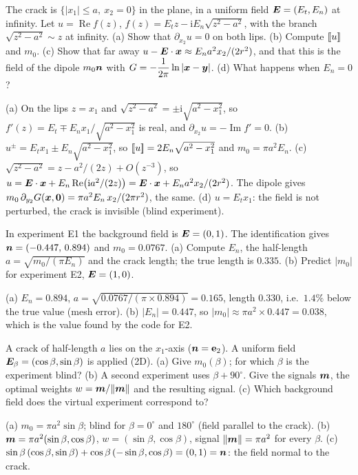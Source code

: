 The crack is $\{|x_1|\le a,\ x_2=0\}$ in the plane, in a uniform field $\bm{E}=(E_t,E_n)$ at infinity. Let $u=\operatorname{Re}f(z)$, $f(z)=E_tz-\mathrm iE_n\sqrt{z^2-a^2}$, with the branch $\sqrt{z^2-a^2}\sim z$ at infinity.
(a) Show that $\partial_{x_2}u=0$ on both lips. (b) Compute $[\![u]\!]$ and $m_0$. (c) Show that far away $u-\bm{E}\cdot\bm{x}\approx E_na^2x_2/(2r^2)$, and that this is the field of the dipole $m_0\bm{n}$ with $\displaystyle G=-\frac1{2\pi}\ln|\bm{x}-\bm{y}|$. (d) What happens when $E_n=0$?
\begin{solution}
(a) On the lips $z=x_1$ and $\sqrt{z^2-a^2}=\pm\mathrm i\sqrt{a^2-x_1^2}$, so $f'(z)=E_t\mp E_nx_1/\sqrt{a^2-x_1^2}$ is real, and $\partial_{x_2}u=-\operatorname{Im}f'=0$.
(b) $u^\pm=E_tx_1\pm E_n\sqrt{a^2-x_1^2}$, so $[\![u]\!]=2E_n\sqrt{a^2-x_1^2}$ and $m_0=\pi a^2E_n$.
(c) $\sqrt{z^2-a^2}=z-a^2/(2z)+O(z^{-3})$, so $u=\bm{E}\cdot\bm{x}+E_n\operatorname{Re}\bigl(\mathrm ia^2/(2z)\bigr)=\bm{E}\cdot\bm{x}+E_na^2x_2/(2r^2)$. The dipole gives $m_0\,\partial_{y_2}G(\bm{x},\mathbf0)=\pi a^2E_n\,x_2/(2\pi r^2)$, the same.
(d) $u=E_tx_1$: the field is not perturbed, the crack is invisible (blind experiment).
\end{solution}

In experiment E1 the background field is $\bm{E}=(0,1)$. The identification gives $\bm{n}=(-0.447,\,0.894)$ and $m_0=0.0767$. (a) Compute $E_n$, the half-length $a=\sqrt{m_0/(\pi E_n)}$ and the crack length; the true length is $0.335$. (b) Predict $|m_0|$ for experiment E2, $\bm{E}=(1,0)$.
\begin{solution}
(a) $E_n=0.894$, $a=\sqrt{0.0767/(\pi\times0.894)}=0.165$, length $0.330$, i.e.\ $1.4\%$ below the true value (mesh error). (b) $|E_n|=0.447$, so $|m_0|\approx\pi a^2\times0.447=0.038$, which is the value found by the code for E2.
\end{solution}

A crack of half-length $a$ lies on the $x_1$-axis ($\bm{n}=\mathbf e_2$). A uniform field $\bm{E}_\beta=(\cos\beta,\sin\beta)$ is applied (2D).
(a) Give $m_0(\beta)$; for which $\beta$ is the experiment blind?
(b) A second experiment uses $\beta+90^\circ$. Give the signals $\bm{m}$, the optimal weights $w=\bm{m}/\|\bm{m}\|$ and the resulting signal.
(c) Which background field does the virtual experiment correspond to?
\begin{solution}
(a) $m_0=\pi a^2\sin\beta$; blind for $\beta=0^\circ$ and $180^\circ$ (field parallel to the crack).
(b) $\bm{m}=\pi a^2(\sin\beta,\cos\beta)$, $w=(\sin\beta,\cos\beta)$, signal $\|\bm{m}\|=\pi a^2$ for every $\beta$.
(c) $\sin\beta\,(\cos\beta,\sin\beta)+\cos\beta\,(-\sin\beta,\cos\beta)=(0,1)=\bm{n}$: the field normal to the crack.
\end{solution}

